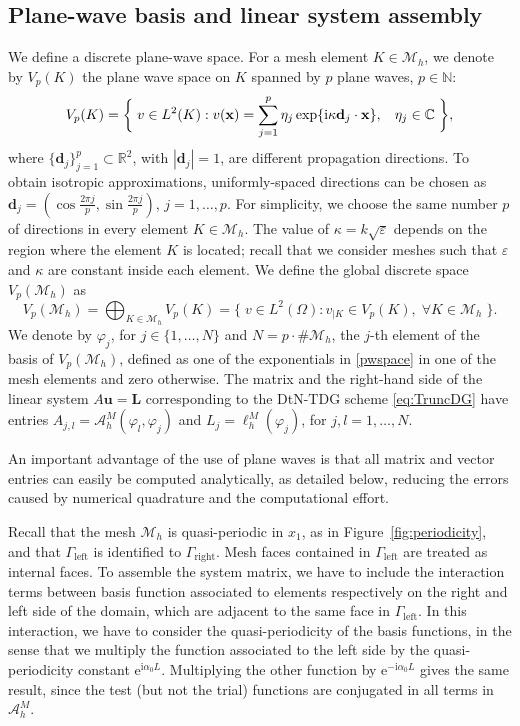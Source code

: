 \documentclass[a4paper,10pt]{article}
\newcommand{\bx}{{\mathbf x}}
\newcommand{\bd}{{\mathbf d}}
\newcommand{\ri}{{\mathrm i}}
\newcommand{\re}{{\mathrm e}}
\newcommand{\Mh}{{\mathcal M_h}}
\newcommand{\cA}{{\mathcal A}}
\newcommand{\Gleft}{\Gamma_{\mathrm{left}}}
\newcommand{\Gright}{\Gamma_{\mathrm{right}}}
\begin{document}
\subsection{Plane-wave basis and linear system assembly}
We define a discrete plane-wave space.
For a mesh element $K \in \Mh$, we denote by $V_p(K)$ the plane wave space on $K$ spanned by $p$ plane waves, $p \in \mathbb{N}$:
\begin{equation} \label{pwspace}
V_p(K) = \bigg\{ \; v \in L^2(K) :  v(\bx) = \sum_{j=1}^p \eta_j 
\exp\{\ri\kappa\bd_j \cdot \bx \}, \hspace{0.3cm} \eta_j \in \mathbb{C} \; \bigg\},
\end{equation}
where $\{ \bd_j \}_{j=1}^p \subset \mathbb{R}^2$, with $|\bd_j|=1$, are different propagation directions.
To obtain isotropic approximations, uniformly-spaced directions can be chosen as 
$\bd_j = ( \cos\frac{2\pi j}p, \sin\frac{2\pi j}p)$, $j=1,\ldots,p$. 
For simplicity, we choose the same number $p$ of directions in every element $K\in\Mh$.
The value of $\kappa=k\sqrt{\varepsilon}$ depends on the region where the element $K$ is located;
recall that we consider meshes such that $\varepsilon$ and $\kappa$ are constant inside each element.
We define the global discrete space $V_p(\Mh)$ as
\begin{equation} \label{pwglobal}
V_p(\Mh)=\bigoplus_{K\in\Mh}V_p(K)
=\big\{ \; v \in L^2(\Omega) : v_{|K} \in V_p(K), \;\forall K \in \Mh \; \big\}.
\end{equation}
We denote by $\varphi_j$, for $j\in\{1,\ldots,N\}$ and $N=p\cdot\#\Mh$, the $j$-th element of the basis of $V_p(\Mh)$, defined as one of the exponentials in \eqref{pwspace} in one of the mesh elements and zero otherwise.
The matrix and the right-hand side of the linear system $A\mathbf u=\mathbf L$ corresponding to the DtN-TDG scheme \eqref{eq:TruncDG} have entries 
$A_{j,l}=\cA_h^M(\varphi_l,\varphi_j)$ and $L_j=\ell_h^M(\varphi_j)$, for $j,l=1,\ldots,N$.

An important advantage of the use of plane waves is that all matrix and vector entries can easily be computed analytically, as detailed below,
reducing the errors caused by numerical quadrature and the computational effort.

Recall that the mesh $\Mh$ is quasi-periodic in $x_1$, as in Figure~\ref{fig:periodicity}, and that $\Gleft$ is identified to $\Gright$.
Mesh faces contained in $\Gleft$ are treated as internal faces.
To assemble the system matrix, we have to include the interaction terms between basis function associated to elements respectively on the right and left side of the domain, which are adjacent to the same face in $\Gleft$.
In this interaction, we have to consider the quasi-periodicity of the basis functions, in the sense that we multiply the function associated to the left side by the quasi-periodicity constant $\re^{\ri\alpha_0 L}$. 
Multiplying the other function by $\re^{-\ri\alpha_0 L}$ gives the same result, since the test (but not the trial) functions are conjugated in all terms in $\cA_h^M$.
\end{document}
